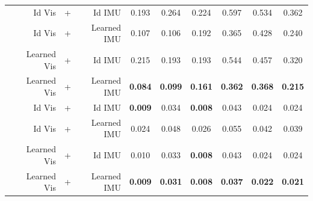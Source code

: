 \begin{table}[!t]
{\begin{tabular}{c@{\hspace{1.5pt}}|r@{\hspace{1pt}}c@{\hspace{2.5pt}}r| cccccc}

        & Id Vis & + & Id IMU
        &  0.193 &  0.264 &  0.224 &  0.597 &  0.534 &  0.362 \\
      
      
        & Id Vis & + & Learned IMU
        &  0.107 &  0.106 &  0.192 &  0.365 &  0.428 &  0.240 \\
          & Learned Vis & + & Id IMU
        &  0.215 &  0.193 &  0.193 &  0.544 &  0.457 &  0.320 \\
          & Learned Vis & + & Learned IMU
        &  \textbf{0.084} &  \textbf{0.099} &  \textbf{0.161} &  \textbf{0.362} &  \textbf{0.368} &  \textbf{0.215} \\
        \midrule
{}

        & Id Vis & + & Id IMU
        &  \textbf{0.009} &  0.034 &  \textbf{0.008} &  0.043 &  0.024 &  0.024 \\
     
        & Id Vis & + & Learned IMU
        &  0.024 &  0.048 &  0.026 &  0.055 &  0.042 &  0.039 \\
         
        & Learned Vis & + & Id IMU
        &  0.010 &  0.033 &  \textbf{0.008} &  0.043 &  0.024 &  0.024 \\
          & Learned Vis & + & Learned IMU
        &  \textbf{0.009} &  \textbf{0.031} &  \textbf{0.008} &  \textbf{0.037} &  \textbf{0.022} &  \textbf{0.021} \\
        \bottomrule


    \end{tabular}
    }
\end{table}
